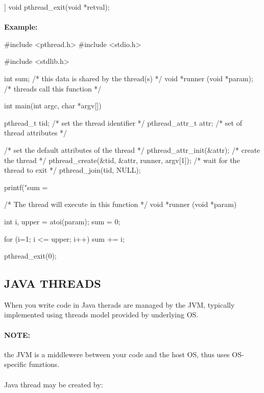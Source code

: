 \begin{codeInC}
[[noreturn]] void pthread_exit(void *retval);
\end{codeInC}

\paragraph{}
\textbf{Example: }


\begin{codeInC}

#include <pthread.h>
#include <stdio.h>

#include <stdlib.h>

int sum; /* this data is shared by the thread(s) */
void *runner (void *param); /* threads call this function */

int main(int argc, char *argv[]) {

    pthread_t tid; /* set the thread identifier */
    pthread_attr_t attr; /* set of thread attributes */
    
    /* set the default attributes of the thread */
    pthread_attr_init(&attr);
    /* create the thread */    
    pthread_create(&tid, &attr, runner, argv[1]);
    /* wait for the thread to exit */    
    pthread_join(tid, NULL);
    
    printf("sum = %
}


/* The thread will execute in this function */
void *runner (void *param){

    int i, upper = atoi(param);
    sum = 0;
    
    for (i=1; i <= upper; i++)
        sum += i;
    
    pthread_exit(0);
}
\end{codeInC}


\subsection{JAVA THREADS}

When you write code in Java therads are managed by the JVM, typically implemented using threads model provided by underlying OS.

\paragraph{NOTE:} the JVM is a middlewere between your code and the host OS, thus uses OS-specific funztions.
\paragraph{}
Java thread may be created by:

